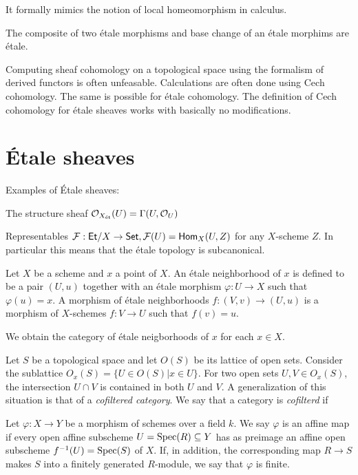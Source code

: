 It formally mimics the notion of local homeomorphism in calculus. 

\begin{proposition}
  The composite of two \'etale morphisms and base change of an \'etale morphims are \'etale.
\end{proposition}

Computing sheaf cohomology on a topological space using the formalism of derived functors is often unfeasable. Calculations are often done using Cech cohomology. The same is possible for \'etale cohomology. The definition of Cech cohomology for \'etale sheaves works with basically no modifications.
\section{\'Etale sheaves}
Examples of \'Etale sheaves:

The structure sheaf $\mathcal{O}_{X_{\text{\'et}}}(U) = \Gamma(U, \mathcal{O}_U)$
\par
Representables $\mathcal{F}: \mathsf{Et}/X \to \mathsf{Set} , \mathcal{F}(U) = \mathsf{Hom}_X(U,Z)$ for any $X$-scheme $Z$. In particular this means that the \'etale topology is subcanonical.
\par


\begin{definition}
  Let $X$ be a scheme and $x$ a point of $X$. An \'etale neighborhood of $x$ is defined to be a pair $(U, u)$ together with an \'etale morphism $\varphi: U \to X$ such that $\varphi(u) = x$. A morphism of \'etale neighborhoods $f: (V,v) \to (U,u)$ is a morphism of $X$-schemes $f: V \to U$ such that $f(v) = u$.
\end{definition}
We obtain the category of \'etale neigborhoods of $x$ for each $x \in X$.

\begin{construction}
  Let $S$ be a topological space and let $O(S)$ be its lattice of open sets. Consider the sublattice $O_x(S) = \{ U \in O(S) | x \in U \}$. For two open sets $U, V \in O_x(S)$, the intersection $U \cap V$ is contained in both $U$ and $V$.
  A generalization of this situation is that of a \textit{cofiltered category}. We say that a category is \textit{cofilterd} if
\end{construction}

\begin{definition}
  Let $\varphi: X \to Y$ be a morphism of schemes over a field $k$. We say $\varphi$ is an affine map if every open affine subscheme $U = \operatorname{Spec}(R) \subseteq Y$ has as preimage an affine open subscheme $f^{-1}(U) = \operatorname{Spec}(S)$ of $X$. If, in addition, the corresponding map $R \to S$ makes $S$ into a finitely generated $R$-module, we say that $\varphi$ is finite.
\end{definition}

